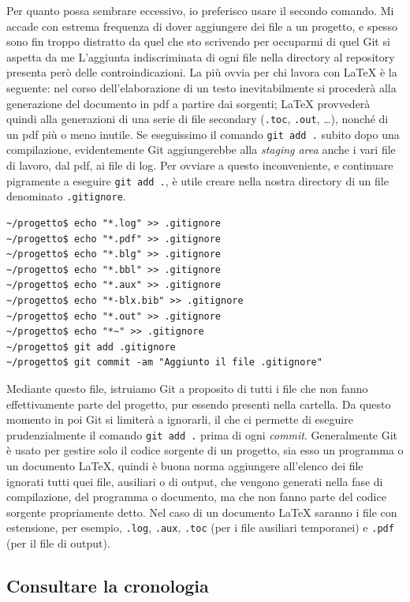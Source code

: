 \documentclass[a4paper,12pt,oneside]{article}
\begin{document}
Per quanto possa sembrare eccessivo, io preferisco usare il secondo comando.
Mi accade con estrema frequenza di
dover aggiungere dei file a un progetto, e spesso sono fin troppo
distratto da quel che sto scrivendo per occuparmi di quel Git si aspetta da me
L'aggiunta indiscriminata di ogni file nella directory al repository presenta
però delle controindicazioni.
La più ovvia per chi lavora con \LaTeX{} è la seguente:
nel corso dell'elaborazione di un testo inevitabilmente si
procederà alla generazione del documento in pdf a partire dai sorgenti;
\LaTeX{} provvederà quindi alla generazioni di una serie di file secondary
(\lstinline|.toc|, \lstinline|.out|, \dots), nonché di un pdf più o meno inutile.
Se eseguissimo il comando \lstinline|git add .| subito dopo una compilazione,
evidentemente Git aggiungerebbe alla \emph{staging area} anche i vari file di
lavoro, dal pdf, ai file  di log. Per ovviare a questo inconveniente, e continuare
pigramente a eseguire \lstinline|git add .|, è utile creare nella nostra
directory di un file denominato \lstinline|.gitignore|.
\begin{lstlisting}
~/progetto$ echo "*.log" >> .gitignore
~/progetto$ echo "*.pdf" >> .gitignore
~/progetto$ echo "*.blg" >> .gitignore
~/progetto$ echo "*.bbl" >> .gitignore
~/progetto$ echo "*.aux" >> .gitignore
~/progetto$ echo "*-blx.bib" >> .gitignore
~/progetto$ echo "*.out" >> .gitignore
~/progetto$ echo "*~" >> .gitignore
~/progetto$ git add .gitignore
~/progetto$ git commit -am "Aggiunto il file .gitignore"
\end{lstlisting}

Mediante questo file, istruiamo Git a proposito di tutti i file che non fanno
effettivamente parte del progetto, pur essendo presenti nella cartella.  Da
questo momento in poi Git si limiterà a ignorarli, il che ci permette di
eseguire prudenzialmente il comando \lstinline|git add .| prima di ogni
\emph{commit}. Generalmente Git è usato per gestire solo il codice sorgente di
un progetto, sia esso un programma o un documento \LaTeX, quindi è buona norma
aggiungere all'elenco dei file ignorati tutti quei file, ausiliari o di output,
che vengono generati nella fase di compilazione, del programma o documento, ma
che non fanno parte del codice sorgente propriamente detto. Nel caso di un
documento \LaTeX{} saranno i file con estensione, per esempio, \lstinline|.log|,
\lstinline|.aux|, \lstinline|.toc| (per i file ausiliari temporanei) e
\lstinline|.pdf| (per il file di output).

\subsection{Consultare la cronologia}
\label{sec:consultare-cronologia}
\end{document}
